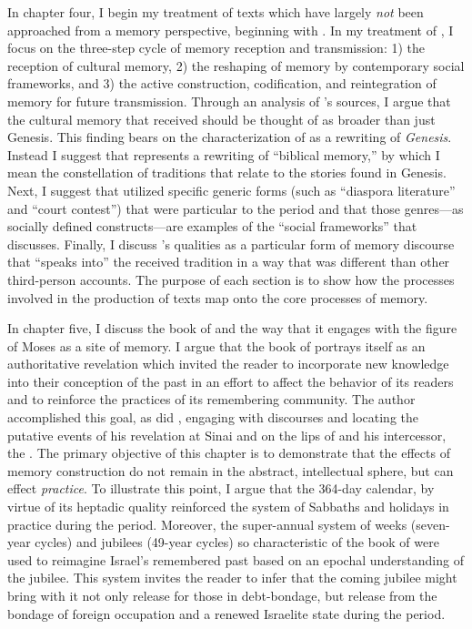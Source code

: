 In chapter four, I begin my treatment of \rwb texts which have largely \emph{not} been approached from a memory perspective, beginning with \ga. In my treatment of \ga, I focus on the three-step cycle of memory reception and transmission: 1) the reception of cultural memory, 2) the reshaping of memory by contemporary social frameworks, and 3) the active construction, codification, and reintegration of memory for future transmission. Through an analysis of \ga's sources, I argue that the cultural memory that \ga received should be thought of as broader than just Genesis. This finding bears on the characterization of \ga as a rewriting of \emph{Genesis}. Instead I suggest that \ga represents a rewriting of ``biblical memory,'' by which I mean the constellation of traditions that relate to the stories found in Genesis. Next, I suggest that \ga utilized specific generic forms (such as ``diaspora literature'' and ``court contest'') that were particular to the \secondtemple period and that those genres---as socially defined constructs---are examples of the ``social frameworks'' that \halbwachs discusses. Finally, I discuss \ga's \psgraphical qualities as a particular form of memory discourse that ``speaks into'' the received tradition in a way that was different than other third-person accounts. The purpose of each section is to show how the processes involved in the production of \rwb texts map onto the core processes of memory.

In chapter five, I discuss the book of \jub and the way that it engages with the figure of Moses as a site of memory. I argue that the book of \jub portrays itself as an authoritative revelation which invited the reader to incorporate new knowledge into their conception of the past in an effort to affect the behavior of its readers and to reinforce the practices of its remembering community. The author accomplished this goal, as did \ga, engaging with \Psgraphical discourses and locating the putative events of his revelation at Sinai and on the lips of \yahweh and his intercessor, the \ap. The primary objective of this chapter is to demonstrate that the effects of memory construction do not remain in the abstract, intellectual sphere, but can effect \emph{practice}. To illustrate this point, I argue that the 364-day calendar, by virtue of its heptadic quality reinforced the system of Sabbaths and holidays in practice during the \secondtemple period. Moreover, the super-annual system of weeks (seven-year cycles) and jubilees (49-year cycles) so characteristic of the book of \jub were used to reimagine Israel's remembered past based on an epochal understanding of the jubilee. This system invites the reader to infer that the coming jubilee might bring with it not only release for those in debt-bondage, but release from the bondage of foreign occupation and a renewed Israelite state during the \secondtemple period.

